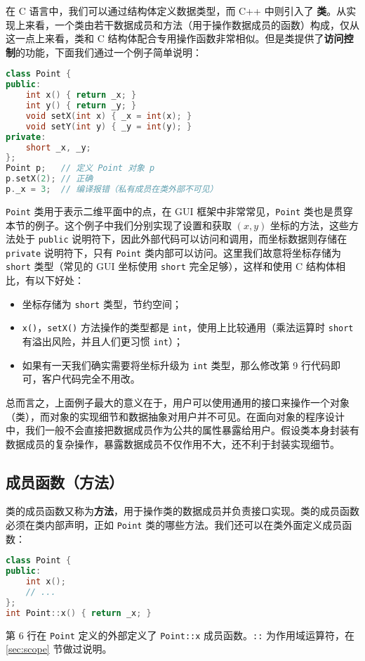 \documentclass[hyperref,UTF8]{article}
\begin{document}
在 C 语言中，我们可以通过结构体定义数据类型，而 C++ 中则引入了 \textbf{类}。从实现上来看，一个类由若干数据成员和方法（用于操作数据成员的函数）构成，仅从这一点上来看，类和 C 结构体配合专用操作函数非常相似。但是类提供了\textbf{访问控制}的功能，下面我们通过一个例子简单说明：
\begin{lstlisting}[language=c++]
class Point {
public:
    int x() { return _x; }
    int y() { return _y; }
    void setX(int x) { _x = int(x); }
    void setY(int y) { _y = int(y); }
private:
    short _x, _y;
};
Point p;   // 定义 Point 对象 p
p.setX(2); // 正确
p._x = 3;  // 编译报错（私有成员在类外部不可见）
\end{lstlisting}
\texttt{Point} 类用于表示二维平面中的点，在 GUI 框架中非常常见，\texttt{Point} 类也是贯穿本节的例子。这个例子中我们分别实现了设置和获取 $(x, y)$ 坐标的方法，这些方法处于 \texttt{public} 说明符下，因此外部代码可以访问和调用，而坐标数据则存储在 \texttt{private} 说明符下，只有 \texttt{Point} 类内部可以访问。这里我们故意将坐标存储为 \texttt{short} 类型（常见的 GUI 坐标使用 \texttt{short} 完全足够），这样和使用 C 结构体相比，有以下好处：
\begin{itemize}
  \item 坐标存储为 \texttt{short} 类型，节约空间；
  \item \texttt{x()}，\texttt{setX()} 方法操作的类型都是 \texttt{int}，使用上比较通用（乘法运算时 \texttt{short} 有溢出风险，并且人们更习惯 \texttt{int}）；
  \item 如果有一天我们确实需要将坐标升级为 \texttt{int} 类型，那么修改第 9 行代码即可，客户代码完全不用改。
\end{itemize}
总而言之，上面例子最大的意义在于，用户可以使用通用的接口来操作一个对象（类），而对象的实现细节和数据抽象对用户并不可见。在面向对象的程序设计中，我们一般不会直接把数据成员作为公共的属性暴露给用户。假设类本身封装有数据成员的复杂操作，暴露数据成员不仅作用不大，还不利于封装实现细节。

\subsection{成员函数（方法）}

类的成员函数又称为\textbf{方法}，用于操作类的数据成员并负责接口实现。类的成员函数必须在类内部声明，正如 \texttt{Point} 类的哪些方法。我们还可以在类外面定义成员函数：
\begin{lstlisting}[language=c++]
class Point {
public:
    int x();
    // ...
};
int Point::x() { return _x; }
\end{lstlisting}
第 6 行在 \texttt{Point} 定义的外部定义了 \texttt{Point::x} 成员函数。\texttt{::} 为作用域运算符，在 \ref{sec:scope} 节做过说明。
\end{document}
